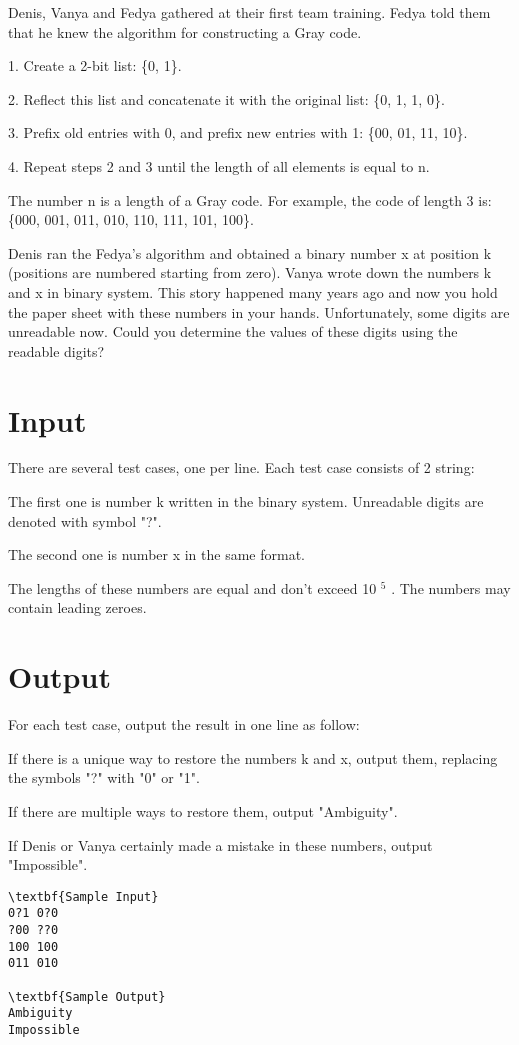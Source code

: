 

Denis, Vanya and Fedya gathered at their first team training. Fedya told them that he knew the algorithm for constructing a Gray code.

1. Create a 2-bit list: \{0, 1\}.

2. Reflect this list and concatenate it with the original list: \{0, 1, 1, 0\}.

3. Prefix old entries with 0, and prefix new entries with 1: \{00, 01, 11, 10\}.

4. Repeat steps 2 and 3 until the length of all elements is equal to n.

The number n is a length of a Gray code. For example, the code of length 3 is: \{000, 001, 011, 010, 110, 111, 101, 100\}.

Denis ran the Fedya's algorithm and obtained a binary number x at position k (positions are numbered starting from zero). Vanya wrote down the numbers k and x in binary system. This story happened many years ago and now you hold the paper sheet with these numbers in your hands. Unfortunately, some digits are unreadable now. Could you determine the values of these digits using the readable digits?

\section{Input}

There are several test cases, one per line. Each test case consists of 2 string:

The first one is number k written in the binary system. Unreadable digits are denoted with symbol "?".

The second one is number x in the same format.

The lengths of these numbers are equal and don't exceed 10 $^ 5 $ . The numbers may contain leading zeroes.

\section{Output}

For each test case, output the result in one line as follow:

If there is a unique way to restore the numbers k and x, output them, replacing the symbols "?" with "0" or "1".

If there are multiple ways to restore them, output "Ambiguity".

If Denis or Vanya certainly made a mistake in these numbers, output "Impossible".
\begin{verbatim}
\textbf{Sample Input}
0?1 0?0
?00 ??0
100 100
011 010

\textbf{Sample Output}
Ambiguity
Impossible\end{verbatim}